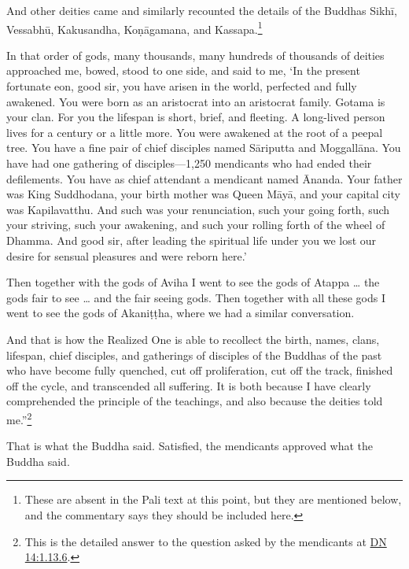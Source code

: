 \documentclass[12pt,openany]{book}%
\begin{document}
And other deities came and similarly recounted the details of the Buddhas \textsanskrit{Sikhī}, \textsanskrit{Vessabhū}, Kakusandha, \textsanskrit{Koṇāgamana}, and Kassapa.\footnote{These are absent in the Pali text at this point, but they are mentioned below, and the commentary says they should be included here. } 

In that order of gods, many thousands, many hundreds of thousands of deities approached me, bowed, stood to one side, and said to me, ‘In the present fortunate eon, good sir, you have arisen in the world, perfected and fully awakened. You were born as an aristocrat into an aristocrat family. Gotama is your clan. For you the lifespan is short, brief, and fleeting. A long-lived person lives for a century or a little more. You were awakened at the root of a peepal tree. You have a fine pair of chief disciples named \textsanskrit{Sāriputta} and \textsanskrit{Moggallāna}. You have had one gathering of disciples—1,250 mendicants who had ended their defilements. You have as chief attendant a mendicant named Ānanda. Your father was King Suddhodana, your birth mother was Queen \textsanskrit{Māyā}, and your capital city was Kapilavatthu. And such was your renunciation, such your going forth, such your striving, such your awakening, and such your rolling forth of the wheel of Dhamma. And good sir, after leading the spiritual life under you we lost our desire for sensual pleasures and were reborn here.’ 

Then together with the gods of Aviha I went to see the gods of Atappa … the gods fair to see … and the fair seeing gods. Then together with all these gods I went to see the gods of \textsanskrit{Akaniṭṭha}, where we had a similar conversation. 

And that is how the Realized One is able to recollect the birth, names, clans, lifespan, chief disciples, and gatherings of disciples of the Buddhas of the past who have become fully quenched, cut off proliferation, cut off the track, finished off the cycle, and transcended all suffering. It is both because I have clearly comprehended the principle of the teachings, and also because the deities told me.”\footnote{This is the detailed answer to the question asked by the mendicants at \href{https://suttacentral.net/dn14/en/sujato\#1.13.6}{DN 14:1.13.6}. } 

That is what the Buddha said. Satisfied, the mendicants approved what the Buddha said. 
\end{document}
